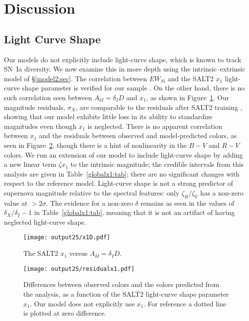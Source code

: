 \documentclass{aastex61}   	%
\begin{document}
\section{Discussion}
\label{discussion:sec}

\subsection{Light Curve Shape}
Our models do not explicitly include light-curve shape, which is known to track SN~Ia diversity.
We now examine this in more depth using the intrinsic--extrinsic model of \S\ref{model2:sec}.
The correlation between $EW_{Si}$ and the SALT2 $x_1$ light-curve shape parameter is verified
for our sample \citep{2017Chotard}.
On the other hand, there is no such correlation seen between $A_{\delta I} = \delta_I D$ and $x_1$, as shown in Figure~\ref{x1:fig}. 
Our magnitude residuals, $\sigma_X$, are comparable to the residuals after SALT2 training
\citep{2010A&A...523A...7G}, showing that our model exhibits little loss in its ability to standardize
magnitudes even though $x_1$ is neglected.
There is no apparent correlation
between $x_1$ and the residuals between observed and model-predicted colors, as seen in
Figure~\ref{x1res:fig},
though there is a hint of nonlinearity in the $B-V$ and $R-V$ colors.
We  run an extension of our model to include light-curve shape by adding a new linear term $\zeta x_1$ to the 
intrinsic magnitude; the credible intervals
from this analysis are given in Table~\ref{globalx1:tab}; there are no significant changes with respect to the reference model. 
Light-curve shape is not a strong predictor of supernova magnitude relative to the spectral features: only $\zeta_R/\zeta_V$
has a non-zero value at $>2\sigma$.
The evidence for a non-zero $\delta$ remains as seen in the values of $\delta_X/\delta_I-1$ in Table~\ref{globalx1:tab}, meaning that it is not an artifact of
having neglected light-curve shape.

\begin{figure}[htbp] %
   \centering
   \texttt{[image: output25/x1D.pdf]}
    \caption{The SALT2 $x_1$ versus $A_{\delta I}  = \delta_I D$.
   \label{x1:fig}}
\end{figure}


\begin{figure}[htbp] %
   \centering
   \texttt{[image: output25/residualx1.pdf]}
    \caption{Differences between observed colors and the colors predicted from the analysis, as a function
            of the SALT2 light-curve shape parameter $x_1$.  Our model does not explicitly use $x_1$.  For reference a dotted line is plotted at zero difference.
   \label{x1res:fig}}
\end{figure}
\end{document}
